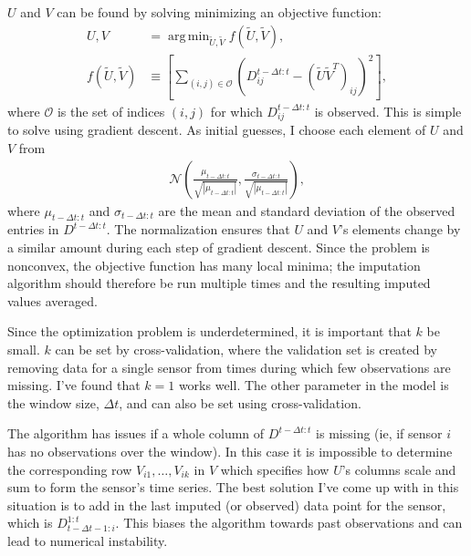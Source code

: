 \documentclass[12pt]{article}
\newcommand{\bigo}{\mathcal{O}}
\DeclareMathOperator*{\argmin}{arg\,min}
\begin{document}
$U$ and $V$ can be found by solving minimizing an objective function:
\begin{align*}
    U, V &= \argmin_{\tilde{U}, \tilde{V}} f(\tilde{U}, \tilde{V}),\\
    f(\tilde{U}, \tilde{V}) &\equiv \left[ \sum_{(i,j)\in \bigo} \left( D^{t-\Delta t:t}_{ij} - (\tilde{U} \tilde{V}^T)_{ij} \right)^2 \right],
\end{align*}
where $\bigo$ is the set of indices $(i,j)$ for which $D^{t-\Delta t:t}_{ij}$ is observed. This is simple to solve using gradient descent. As initial guesses, I choose each element of $U$ and $V$ from
\begin{align*}
    \mathcal{N}\left( \frac{\mu_{t-\Delta t:t}}{\sqrt{|\mu_{t-\Delta t:t}|}}, \frac{\sigma_{t-\Delta t:t}}{\sqrt{|\mu_{t-\Delta t:t}|}} \right),
\end{align*}
where $\mu_{t-\Delta t:t}$ and $\sigma_{t-\Delta t:t}$ are the mean and standard deviation of the observed entries in $D^{t-\Delta t:t}$. The normalization ensures that $U$ and $V$'s elements change by a similar amount during each step of gradient descent. Since the problem is nonconvex, the objective function has many local minima; the imputation algorithm should therefore be run multiple times and the resulting imputed values averaged.

Since the optimization problem is underdetermined, it is important that $k$ be small. $k$ can be set by cross-validation, where the validation set is created by removing data for a single sensor from times during which few observations are missing. I've found that $k=1$ works well. The other parameter in the model is the window size, $\Delta t$, and can also be set using cross-validation.

The algorithm has issues if a whole column of $D^{t-\Delta t:t}$ is missing (ie, if sensor $i$ has no observations over the window). In this case it is impossible to determine the corresponding row $V_{i1}, \dots, V_{ik}$ in $V$ which specifies how $U$'s columns scale and sum to form the sensor's time series. The best solution I've come up with in this situation is to add in the last imputed (or observed) data point for the sensor, which is $D^{1:t}_{t-\Delta t-1:i}$. This biases the algorithm towards past observations and can lead to numerical instability.
\end{document}
